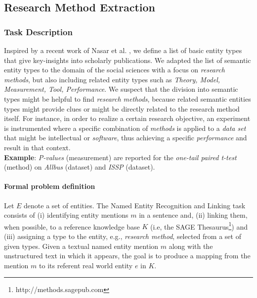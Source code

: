 \subsection{Research Method Extraction}
\label{section:research_method_extraction}


\subsubsection{Task Description}
Inspired by a recent work of Nasar et al.
\cite{nasar2018information}, we define a list of basic entity types that give key-insights into scholarly publications. 
We adapted the list of semantic entity types to the domain of the social sciences with a focus on \textit{research methods},
but also including related entity types such as \textit{Theory, Model, Measurement, Tool, Performance}. We suspect that the division into semantic types might be helpful to find \textit{research methods}, because
related semantic entities types might provide clues or might be directly related to the research method itself.
For instance, in order to realize a certain research objective, an experiment is instrumented where a specific combination of \textit{methods} is applied to a \textit{data set} that might be intellectual or \textit{software}, thus achieving a specific \textit{performance} and result in that context.\\
\textbf{Example}: \textit{P-values} (measurement) are reported for the \textit{one-tail paired t-test} (method) on \textit{Allbus} (dataset) and \textit{ISSP} (dataset).\\


\paragraph{Formal problem definition}%
Let $E$ denote a set of entities. The Named Entity Recognition and Linking task consists of (i) identifying entity mentions  $m$ in a sentence and, (ii) linking them, when possible, to a  reference knowledge base  $K$ (i.e, the SAGE Thesaurus\footnote{http://methods.sagepub.com}) 
and (iii) assigning a type to the entity, e.g., \textit{research method}, selected from a set of given types. 
Given a textual named entity mention $m$ along with the unstructured text in which it appears, the goal is to produce a mapping from the mention  $m$ to its referent real world entity  $e$ in  $K$.

